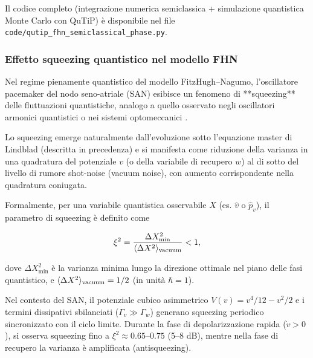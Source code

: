 \documentclass[11pt,a4paper]{article}
\let\oldcite\cite
\renewcommand{\cite}{\protect\oldcite}
\theoremstyle{plain}
\theoremstyle{definition}
\begin{document}
Il codice completo (integrazione numerica semiclassica + simulazione quantistica Monte Carlo con QuTiP) è disponibile nel file \texttt{code/qutip\_fhn\_semiclassical\_phase.py}.


\vspace{0.4cm}



\subsubsection{Effetto squeezing quantistico nel modello FHN}
\label{subsubsec:fhn-squeezing}

Nel regime pienamente quantistico del modello FitzHugh–Nagumo, l’oscillatore pacemaker del nodo seno-atriale (SAN) esibisce un fenomeno di **squeezing** delle fluttuazioni quantistiche, analogo a quello osservato negli oscillatori armonici quantistici o nei sistemi optomeccanici \cite{Walls1983, Scully1997}.  

Lo squeezing emerge naturalmente dall’evoluzione sotto l’equazione master di Lindblad (descritta in precedenza) e si manifesta come riduzione della varianza in una quadratura del potenziale $v$ (o della variabile di recupero $w$) al di sotto del livello di rumore shot-noise (vacuum noise), con aumento corrispondente nella quadratura coniugata. 

\vspace{0.3cm}


Formalmente, per una variabile quantistica osservabile $X$ (es. $\hat{v}$ o $\hat{p}_v$), il parametro di squeezing è definito come

\begin{equation}
\xi^2 = \frac{\Delta X_{\min}^2}{\langle \Delta X^2 \rangle_{\rm vacuum}} < 1,
\label{eq:squeezing-parameter}
\end{equation}

dove $\Delta X_{\min}^2$ è la varianza minima lungo la direzione ottimale nel piano delle fasi quantistico, e $\langle \Delta X^2 \rangle_{\rm vacuum} = 1/2$ (in unità $\hbar = 1$).

\vspace{0.4cm}

Nel contesto del SAN, il potenziale cubico asimmetrico $V(v) = v^4/12 - v^2/2$ e i termini dissipativi sbilanciati ($\Gamma_v \gg \Gamma_w$) generano squeezing periodico sincronizzato con il ciclo limite. Durante la fase di depolarizzazione rapida ($\dot{v} > 0$), si osserva squeezing fino a $\xi^2 \approx 0.65$--$0.75$ (5--8 dB), mentre nella fase di recupero la varianza è amplificata (antisqueezing). 
\end{document}
